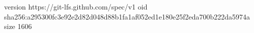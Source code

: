 version https://git-lfs.github.com/spec/v1
oid sha256:a295300fc3e92e2d82d048d88b1fa1af052ed1e180e25f2eda700b222da5974a
size 1606
